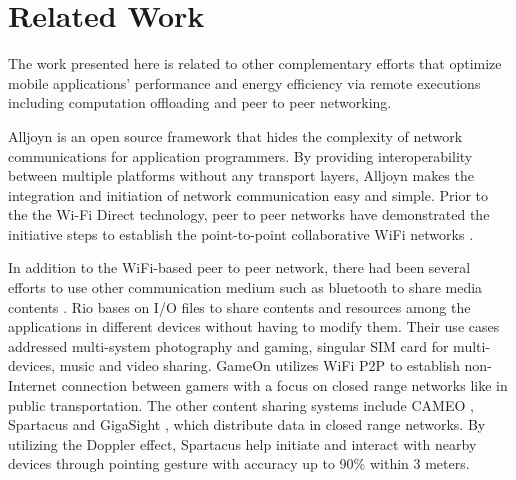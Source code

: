 \documentclass{sig-alternate}
\begin{document}


\section{Related Work}
\label{sec:related}
The work presented here is related to other complementary efforts that optimize mobile applications' performance and energy efficiency via remote executions including computation offloading and peer to peer networking.

Alljoyn \cite{alljoyn} is an open source framework that hides the complexity of network communications for application programmers. By providing interoperability between multiple platforms without any transport layers, Alljoyn makes the integration and initiation of network communication easy and simple. Prior to the the Wi-Fi Direct technology, peer to peer networks have demonstrated the initiative steps to establish the point-to-point collaborative WiFi networks \cite{m_p2p_tutor}. 

In addition to the WiFi-based peer to peer network, there had been several efforts to use other communication medium such as bluetooth to share media contents \cite{media_share}. Rio \cite{rio} bases on I/O files to share contents and resources among the applications in different devices without having to modify them. Their use cases addressed multi-system photography and gaming, singular SIM card for multi-devices, music and video sharing. GameOn \cite{gameon} utilizes WiFi P2P to establish non-Internet connection between gamers with a focus on closed range networks like in public transportation. The other content sharing systems include CAMEO \cite{cameo}, Spartacus \cite{spartacus} and GigaSight \cite{crowd-sourcing}, which distribute data in closed range networks. By utilizing the Doppler effect, Spartacus help initiate and interact with nearby devices through pointing gesture with accuracy up to 90\% within 3 meters.
\end{document}
